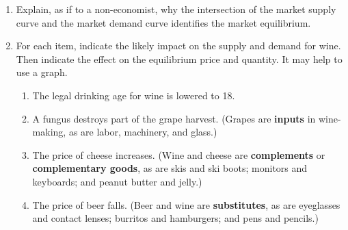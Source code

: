 \begin{enumerate}


\item Explain, as if to a non-economist, why the intersection of the market supply curve and the market demand curve identifies the market equilibrium.









\item For each item, indicate the likely impact on the supply and demand for wine. Then indicate the effect on the equilibrium price and quantity. It may help to use a graph.

    \begin{enumerate}
    \item The legal drinking age for wine is lowered to 18.
    \item A fungus destroys part of the grape harvest. (Grapes are \textbf{inputs} in wine-making, as are labor, machinery, and glass.)
    \item The price of cheese increases. (Wine and cheese are \textbf{complements} or \textbf{complementary goods}, as are skis and ski boots; monitors and keyboards; and peanut butter and jelly.)
    \item The price of beer falls. (Beer and wine are \textbf{substitutes}, as are eyeglasses and contact lenses; burritos and hamburgers; and pens and pencils.)
    \end{enumerate}










\end{enumerate}
